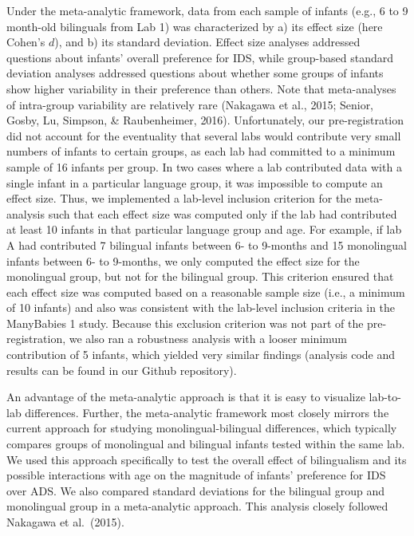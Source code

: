 \documentclass[,man,floatsintext]{apa6}
\begin{document}
Under the meta-analytic framework, data from each sample of infants (e.g., 6 to 9 month-old bilinguals from Lab 1) was characterized by a) its effect size (here Cohen's \(d\)), and b) its standard deviation. Effect size analyses addressed questions about infants' overall preference for IDS, while group-based standard deviation analyses addressed questions about whether some groups of infants show higher variability in their preference than others. Note that meta-analyses of intra-group variability are relatively rare (Nakagawa et al., 2015; Senior, Gosby, Lu, Simpson, \& Raubenheimer, 2016). Unfortunately, our pre-registration did not account for the eventuality that several labs would contribute very small numbers of infants to certain groups, as each lab had committed to a minimum sample of 16 infants per group. In two cases where a lab contributed data with a single infant in a particular language group, it was impossible to compute an effect size. Thus, we implemented a lab-level inclusion criterion for the meta-analysis such that each effect size was computed only if the lab had contributed at least 10 infants in that particular language group and age. For example, if lab A had contributed 7 bilingual infants between 6- to 9-months and 15 monolingual infants between 6- to 9-months, we only computed the effect size for the monolingual group, but not for the bilingual group. This criterion ensured that each effect size was computed based on a reasonable sample size (i.e., a minimum of 10 infants) and also was consistent with the lab-level inclusion criteria in the ManyBabies 1 study. Because this exclusion criterion was not part of the pre-registration, we also ran a robustness analysis with a looser minimum contribution of 5 infants, which yielded very similar findings (analysis code and results can be found in our Github repository).

An advantage of the meta-analytic approach is that it is easy to visualize lab-to-lab differences. Further, the meta-analytic framework most closely mirrors the current approach for studying monolingual-bilingual differences, which typically compares groups of monolingual and bilingual infants tested within the same lab. We used this approach specifically to test the overall effect of bilingualism and its possible interactions with age on the magnitude of infants' preference for IDS over ADS. We also compared standard deviations for the bilingual group and monolingual group in a meta-analytic approach. This analysis closely followed Nakagawa et al.~(2015).
\end{document}
